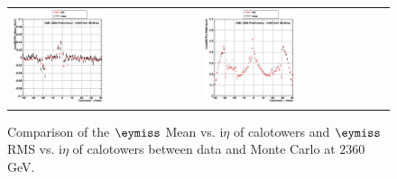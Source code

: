 \begin{figure}[h!]
 \centering
 \begin{tabular}{ll}
  \includegraphics[width=0.5\textwidth]{plots_DataVsMC_MB_2360GeV/g_calometPyMean_vs_ieta_2360.eps} &
  \includegraphics[width=0.5\textwidth]{plots_DataVsMC_MB_2360GeV/g_calometPyRMS_vs_ieta_2360.eps} \\
 \end{tabular}
 \caption{\small Comparison of the $\eymiss$ Mean vs. i$\eta$ of calotowers and $\eymiss$ RMS vs. i$\eta$ of calotowers between 
          data and Monte Carlo at $2360$ GeV.\label{fig:METy_MeanRMS_vs_ieta_2360}}
\end{figure}


\clearpage
